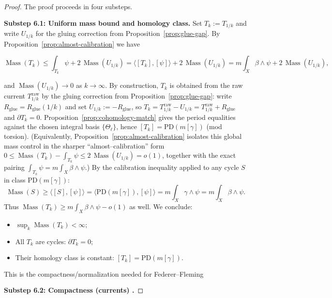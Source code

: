 \documentclass[11pt]{article}
\numberwithin{equation}{section}  %
\theoremstyle{plain}
\theoremstyle{definition}
\theoremstyle{remark}
\DeclareMathOperator{\Mass}{Mass}
\begin{document}
\begin{proof}
The proof proceeds in four substeps.

\medskip\noindent
\textbf{Substep 6.1: Uniform mass bound and homology class.}
Set $T_k:=T_{1/k}$ and write $U_{1/k}$ for the gluing correction from Proposition~\ref{prop:glue-gap}.  By Proposition~\ref{prop:almost-calibration} we have

\[
\Mass(T_k)\le \int_{T_k}\psi + 2\,\Mass(U_{1/k})
= \langle[T_k],[\psi]\rangle + 2\,\Mass(U_{1/k})
= m\int_X\beta\wedge\psi + 2\,\Mass(U_{1/k}),
\]

and $\Mass(U_{1/k})\to 0$ as $k\to\infty$.
By construction, $T_k$ is obtained from the raw current $T^{\mathrm{raw}}_{1/k}$ by the gluing correction from Proposition~\ref{prop:glue-gap}:
write $R_{\mathrm{glue}}=R_{\mathrm{glue}}(1/k)$ and set $U_{1/k}:=-R_{\mathrm{glue}}$, so $T_k=T^{\mathrm{raw}}_{1/k}-U_{1/k}=T^{\mathrm{raw}}_{1/k}+R_{\mathrm{glue}}$ and $\partial T_k=0$.
Proposition~\ref{prop:cohomology-match} gives the period equalities against the chosen integral basis $\{\Theta_\ell\}$, hence $[T_k]=\mathrm{PD}(m[\gamma])$ (mod torsion).
(Equivalently, Proposition~\ref{prop:almost-calibration} isolates this global mass control in the sharper ``almost--calibration'' form
$0\le \Mass(T_k)-\int_{T_k}\psi\le 2\,\Mass(U_{1/k})=o(1)$, together with the exact pairing
$\int_{T_k}\psi=m\int_X\beta\wedge\psi$.)
By the calibration inequality applied to any
cycle $S$ in class $\mathrm{PD}(m[\gamma])$:
\[
\Mass(S)\ge\langle[S],[\psi]\rangle=\langle\mathrm{PD}(m[\gamma]),[\psi]\rangle
=m\int_X\gamma\wedge\psi=m\int_X\beta\wedge\psi.
\]
Thus $\Mass(T_k)\ge m\int_X\beta\wedge\psi-o(1)$ as well.  We conclude:
\begin{itemize}
\item $\sup_k\Mass(T_k)<\infty$;
\item All $T_k$ are cycles: $\partial T_k=0$;
\item Their homology class is constant: $[T_k]=\mathrm{PD}(m[\gamma])$.
\end{itemize}
This is the compactness/\allowbreak normalization needed for Federer--Fleming


\medskip\noindent
\textbf{Substep 6.2: Compactness (currents) \cite[\S\S 4.1--4.2]{Fed69}.}


\end{proof}
\end{document}
